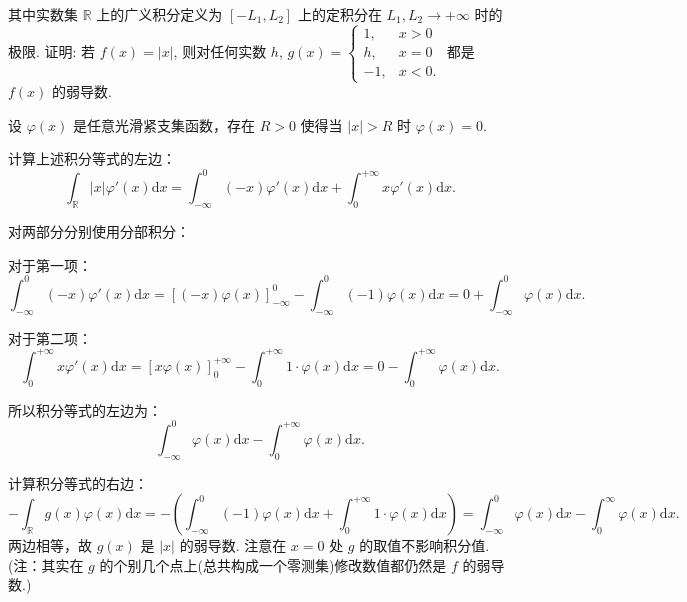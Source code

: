 \begin{enumerate}
    其中实数集 \(\mathbb{R}\) 上的广义积分定义为 \(\displaystyle[- L_{1},L_{2}]\) 上的定积分在 \(\displaystyle L_{1},L_{2}\to +\infty\) 时的极限. 
    证明: 若 \(f(x) = |x|\), 则对任何实数 \(h\), 
    \(\displaystyle g(x) = 
    \left\{ 
    \begin{array}{ll}
    1, & x > 0 \\ 
    h, & x = 0 \\ 
    -1, & x< 0.
    \end{array} 
    \right.\) 
    都是 \(f(x)\) 的弱导数.
    \begin{solution}
        设 $\varphi(x)$ 是任意光滑紧支集函数，存在 $R > 0$ 使得当 $|x| > R$ 时 $\varphi(x) = 0$.

        计算上述积分等式的左边：
        \[
        \int_{\mathbb{R}} |x| \varphi'(x) \mathrm{d}x = \int_{-\infty}^0 (-x) \varphi'(x) \mathrm{d}x + \int_0^{+\infty} x \varphi'(x) \mathrm{d}x.
        \]

        对两部分分别使用分部积分：

        对于第一项：
        \[
        \int_{-\infty}^0 (-x) \varphi'(x) \mathrm{d}x = \left[ (-x) \varphi(x) \right]_{-\infty}^0 - \int_{-\infty}^0 (-1) \varphi(x) \mathrm{d}x = 0 + \int_{-\infty}^0 \varphi(x) \mathrm{d}x.
        \]

        对于第二项：
        \[
        \int_0^{+\infty} x \varphi'(x) \mathrm{d}x = \left[ x \varphi(x) \right]_0^{+\infty} - \int_0^{+\infty} 1 \cdot \varphi(x) \mathrm{d}x = 0 - \int_0^{+\infty} \varphi(x) \mathrm{d}x.
        \]

        所以积分等式的左边为：
        \[
        \int_{-\infty}^0 \varphi(x) \mathrm{d}x - \int_0^{+\infty} \varphi(x) \mathrm{d}x.
        \]

        计算积分等式的右边：
        \[
        -\int_{\mathbb{R}} g(x) \varphi(x) \mathrm{d}x = -\left( \int_{-\infty}^0 (-1) \varphi(x) \mathrm{d}x + \int_0^{+\infty} 1 \cdot \varphi(x) \mathrm{d}x \right) = \int_{-\infty}^0 \varphi(x) \mathrm{d}x - \int_0^{\infty} \varphi(x) \mathrm{d}x.
        \]
        两边相等，故 $g(x)$ 是 $|x|$ 的弱导数. 注意在 $x=0$ 处 $g$ 的取值不影响积分值.\\
        (注：其实在 $g$ 的个别几个点上(总共构成一个零测集)修改数值都仍然是 $f$ 的弱导数.)
    \end{solution}


\end{enumerate}
